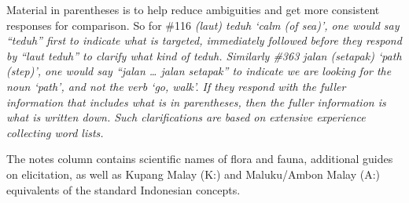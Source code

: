 Material in parentheses is to help reduce
ambiguities and get more consistent responses for comparison.
So for {\#}116 \it{(laut) teduh} ‘calm (of sea)’,
one would say “teduh” first to indicate what is targeted,
immediately followed before they respond by “laut teduh” to clarify
what kind of \it{teduh}.
Similarly {\#}363 \it{jalan (setapak)} ‘path (step)’,
one would say “jalan {\ldots} jalan setapak” to indicate we are
looking for the noun ‘path’,
and not the verb ‘go, walk’.
If they respond with the fuller information that includes what
is in parentheses, then the fuller information is what is written down.
Such clarifications are based on extensive experience collecting word lists.

The notes column contains scientific names of flora
and fauna, additional guides on elicitation,
as well as Kupang Malay (K:)
and Maluku/Ambon Malay (A:) equivalents of the standard Indonesian concepts.

